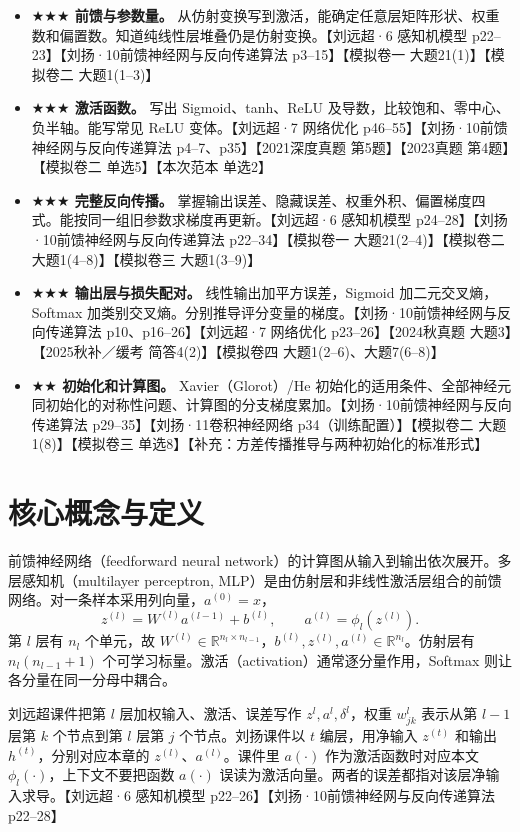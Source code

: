 \documentclass[UTF8,a4paper,zihao=-4,fontset=fandol]{ctexrep}
\begin{document}
\begin{itemize}
\item \textbf{\(\bigstar\bigstar\bigstar\) 前馈与参数量。} 从仿射变换写到激活，能确定任意层矩阵形状、权重数和偏置数。知道纯线性层堆叠仍是仿射变换。【刘远超·6 感知机模型 p22--23】【刘扬·10前馈神经网与反向传递算法 p3--15】【模拟卷一 大题21(1)】【模拟卷二 大题1(1--3)】
\item \textbf{\(\bigstar\bigstar\bigstar\) 激活函数。} 写出 Sigmoid、tanh、ReLU 及导数，比较饱和、零中心、负半轴。能写常见 ReLU 变体。【刘远超·7 网络优化 p46--55】【刘扬·10前馈神经网与反向传递算法 p4--7、p35】【2021深度真题 第5题】【2023真题 第4题】【模拟卷二 单选5】【本次范本 单选2】
\item \textbf{\(\bigstar\bigstar\bigstar\) 完整反向传播。} 掌握输出误差、隐藏误差、权重外积、偏置梯度四式。能按同一组旧参数求梯度再更新。【刘远超·6 感知机模型 p24--28】【刘扬·10前馈神经网与反向传递算法 p22--34】【模拟卷一 大题21(2--4)】【模拟卷二 大题1(4--8)】【模拟卷三 大题1(3--9)】
\item \textbf{\(\bigstar\bigstar\bigstar\) 输出层与损失配对。} 线性输出加平方误差，Sigmoid 加二元交叉熵，Softmax 加类别交叉熵。分别推导评分变量的梯度。【刘扬·10前馈神经网与反向传递算法 p10、p16--26】【刘远超·7 网络优化 p23--26】【2024秋真题 大题3】【2025秋补／缓考 简答4(2)】【模拟卷四 大题1(2--6)、大题7(6--8)】
\item \textbf{\(\bigstar\bigstar\) 初始化和计算图。} Xavier（Glorot）/He 初始化的适用条件、全部神经元同初始化的对称性问题、计算图的分支梯度累加。【刘扬·10前馈神经网与反向传递算法 p29--35】【刘扬·11卷积神经网络 p34（训练配置）】【模拟卷二 大题1(8)】【模拟卷三 单选8】【补充：方差传播推导与两种初始化的标准形式】
\end{itemize}

\section{核心概念与定义}

前馈神经网络（feedforward neural network）的计算图从输入到输出依次展开。多层感知机（multilayer perceptron, MLP）是由仿射层和非线性激活层组合的前馈网络。对一条样本采用列向量，$a^{(0)}=x$，
\[
 z^{(l)}=W^{(l)}a^{(l-1)}+b^{(l)},\qquad
 a^{(l)}=\phi_l(z^{(l)}).
\]
第 $l$ 层有 $n_l$ 个单元，故 $W^{(l)}\in\mathbb R^{n_l\times n_{l-1}}$，$b^{(l)},z^{(l)},a^{(l)}\in\mathbb R^{n_l}$。仿射层有 $n_l(n_{l-1}+1)$ 个可学习标量。激活（activation）通常逐分量作用，Softmax 则让各分量在同一分母中耦合。

刘远超课件把第 $l$ 层加权输入、激活、误差写作 $z^l,a^l,\delta^l$，权重 $w^l_{jk}$ 表示从第 $l-1$ 层第 $k$ 个节点到第 $l$ 层第 $j$ 个节点。刘扬课件以 $t$ 编层，用净输入 $z^{(t)}$ 和输出 $h^{(t)}$，分别对应本章的 $z^{(l)}$、$a^{(l)}$。课件里 $a(\cdot)$ 作为激活函数时对应本文 $\phi_l(\cdot)$，上下文不要把函数 $a(\cdot)$ 误读为激活向量。两者的误差都指对该层净输入求导。【刘远超·6 感知机模型 p22--26】【刘扬·10前馈神经网与反向传递算法 p22--28】
\end{document}
